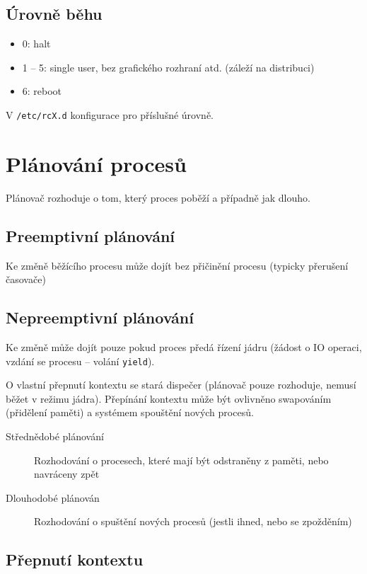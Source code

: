 \documentclass[a4paper, 11pt]{report}
\begin{document}
\subsection{Úrovně běhu}
\begin{itemize}
	\item 0: halt
	\item 1 -- 5: single user, bez grafického rozhraní atd. (záleží na distribuci)
	\item 6: reboot
\end{itemize}

V \verb|/etc/rcX.d| konfigurace pro příslušné úrovně.

\section{Plánování procesů}

Plánovač rozhoduje o tom, který proces poběží a případně jak dlouho.

\subsection{Preemptivní plánování}

Ke změně běžícího procesu může dojít bez přičinění procesu (typicky přerušení časovače)

\subsection{Nepreemptivní plánování}

Ke změně může dojít pouze pokud proces předá řízení jádru (žádost o IO operaci, vzdání se procesu -- volání \verb|yield|).

O vlastní přepnutí kontextu se stará dispečer (plánovač pouze rozhoduje, nemusí běžet v režimu jádra). Přepínání kontextu může být ovlivněno swapováním (přidělení paměti) a systémem spouštění nových procesů.

\begin{description}
	\item[Střednědobé plánování] Rozhodování o procesech, které mají být odstraněny z paměti, nebo navráceny zpět
	\item[Dlouhodobé plánován] Rozhodování o spuštění nových procesů (jestli ihned, nebo se zpožděním)
\end{description}

\subsection{Přepnutí kontextu}
\end{document}

